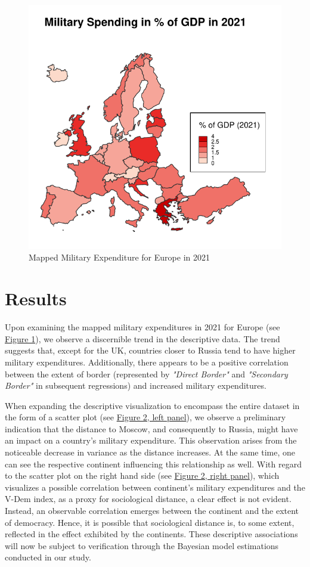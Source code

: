 \documentclass[12pt,a4paper]{article}
\begin{document}
\begin{figure}[h]
\center
\label{F:1}
\includegraphics[scale=0.7]{Map1.pdf}
\caption{Mapped Military Expenditure for Europe in 2021}
\end{figure}
\section{Results}
Upon examining the mapped military expenditures in 2021 for Europe (see \hyperref[F:1]{\color{blue}Figure 1}), we observe a discernible trend in the descriptive data. The trend suggests that, except for the UK, countries closer to Russia tend to have higher military expenditures. Additionally, there appears to be a positive correlation between the extent of border (represented by \textit{"Direct Border"} and \textit{"Secondary Border"} in subsequent regressions) and increased military expenditures.



When expanding the descriptive visualization to encompass the entire dataset in the form of a scatter plot (see \hyperref[F:2]{\color{blue}Figure 2, left panel}), we observe a preliminary indication that the distance to Moscow, and consequently to Russia, might have an impact on a country's military expenditure. This observation arises from the noticeable decrease in variance as the distance increases. At the same time, one can see the respective continent influencing this relationship as well. 
With regard to the scatter plot on the right hand side  (see \hyperref[F:2]{\color{blue}Figure 2, right panel}), which visualizes a possible correlation between continent's military expenditures and the V-Dem index, as a proxy for sociological distance, a clear effect is not evident. Instead, an observable correlation emerges between the continent and the extent of democracy. Hence, it is possible that sociological distance is, to some extent, reflected in the effect exhibited by the continents. These descriptive associations will now be subject to verification through the Bayesian model estimations conducted in our study.
\end{document}

